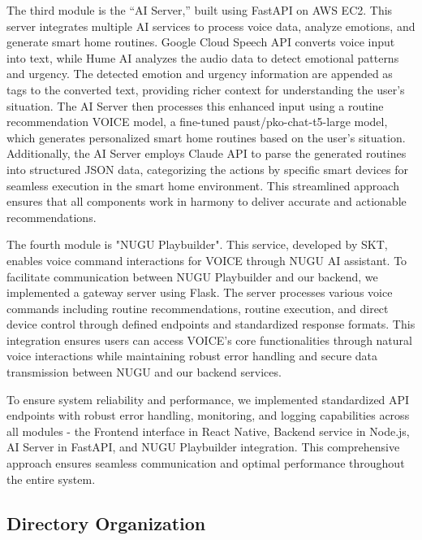 \documentclass[conference]{IEEEtran}
\begin{document}
The third module is the “AI Server,” built using FastAPI on AWS EC2. This server integrates multiple AI services to process voice data, analyze emotions, and generate smart home routines. Google Cloud Speech API converts voice input into text, while Hume AI analyzes the audio data to detect emotional patterns and urgency. The detected emotion and urgency information are appended as tags to the converted text, providing richer context for understanding the user’s situation. The AI Server then processes this enhanced input using a routine recommendation VOICE model, a fine-tuned paust/pko-chat-t5-large model, which generates personalized smart home routines based on the user’s situation. Additionally, the AI Server employs Claude API to parse the generated routines into structured JSON data, categorizing the actions by specific smart devices for seamless execution in the smart home environment. This streamlined approach ensures that all components work in harmony to deliver accurate and actionable recommendations.

The fourth module is "NUGU Playbuilder". This service, developed by SKT, enables voice command interactions for VOICE through NUGU AI assistant. To facilitate communication between NUGU Playbuilder and our backend, we implemented a gateway server using Flask. The server processes various voice commands including routine recommendations, routine execution, and direct device control through defined endpoints and standardized response formats. This integration ensures users can access VOICE's core functionalities through natural voice interactions while maintaining robust error handling and secure data transmission between NUGU and our backend services.

To ensure system reliability and performance, we implemented standardized API endpoints with robust error handling, monitoring, and logging capabilities across all modules - the Frontend interface in React Native, Backend service in Node.js, AI Server in FastAPI, and NUGU Playbuilder integration. This comprehensive approach ensures seamless communication and optimal performance throughout the entire system.

\clearpage

\subsection{Directory Organization}
\vspace{0.5em}
\end{document}
